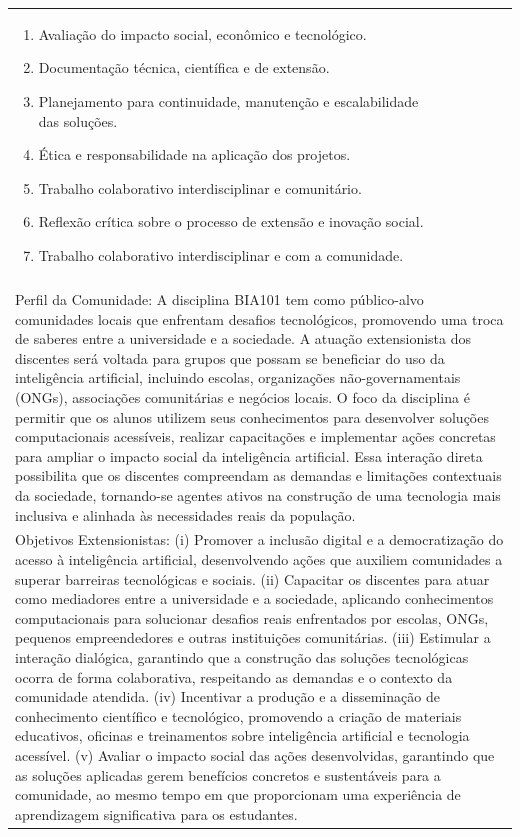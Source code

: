 \documentclass[11pt]{article}
\begin{document}
\begin{center}
\begin{longtable}{|p{4cm}|p{4cm}|p{4cm}|p{4cm}|}
{\begin{enumerate}
\item Avaliação do impacto social, econômico e tecnológico.
\item Documentação técnica, científica e de extensão.
\item Planejamento para continuidade, manutenção e escalabilidade das soluções.
\item Ética e responsabilidade na aplicação dos projetos.
\item Trabalho colaborativo interdisciplinar e comunitário.
\item Reflexão crítica sobre o processo de extensão e inovação social.
\item Trabalho colaborativo interdisciplinar e com a comunidade.\end{enumerate}}\\
\multicolumn{4}{|p{16cm}|}{}\\
\multicolumn{4}{|p{16cm}|}{Perfil da Comunidade: A disciplina BIA101 tem como público-alvo comunidades locais que enfrentam desafios tecnológicos, promovendo uma troca de saberes entre a universidade e a sociedade. A atuação extensionista dos discentes será voltada para grupos que possam se beneficiar do uso da inteligência artificial, incluindo escolas, organizações não-governamentais (ONGs), associações comunitárias e negócios locais. O foco da disciplina é permitir que os alunos utilizem seus conhecimentos para desenvolver soluções computacionais acessíveis, realizar capacitações e implementar ações concretas para ampliar o impacto social da inteligência artificial. Essa interação direta possibilita que os discentes compreendam as demandas e limitações contextuais da sociedade, tornando-se agentes ativos na construção de uma tecnologia mais inclusiva e alinhada às necessidades reais da população.}\\
\multicolumn{4}{|p{16cm}|}{Objetivos Extensionistas: (i) Promover a inclusão digital e a democratização do acesso à inteligência artificial, desenvolvendo ações que auxiliem comunidades a superar barreiras tecnológicas e sociais. (ii) Capacitar os discentes para atuar como mediadores entre a universidade e a sociedade, aplicando conhecimentos computacionais para solucionar desafios reais enfrentados por escolas, ONGs, pequenos empreendedores e outras instituições comunitárias. (iii) Estimular a interação dialógica, garantindo que a construção das soluções tecnológicas ocorra de forma colaborativa, respeitando as demandas e o contexto da comunidade atendida. (iv) Incentivar a produção e a disseminação de conhecimento científico e tecnológico, promovendo a criação de materiais educativos, oficinas e treinamentos sobre inteligência artificial e tecnologia acessível. (v) Avaliar o impacto social das ações desenvolvidas, garantindo que as soluções aplicadas gerem benefícios concretos e sustentáveis para a comunidade, ao mesmo tempo em que proporcionam uma experiência de aprendizagem significativa para os estudantes.}\\

\end{longtable}
\end{center}
\end{document}
